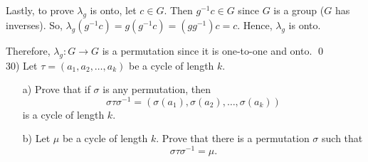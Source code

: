 \documentclass{article}
\begin{document}
Lastly, to prove $\lambda_g$ is onto, let $c \in G$. Then $g^{-1}c \in G$ since $G$ is a group ($G$ has inverses).  So, $\lambda_g(g^{-1}c) = g(g^{-1}c) = (gg^{-1})c = c.$ Hence, $\lambda_g$ is onto.

Therefore, $\lambda _g : G \to G$ is a permutation since it is one-to-one and onto. \qed \\

30) Let $\tau = (a_1, a_2, \ldots, a_k)$ be a cycle of length $k$.  \\
\begin{enumerate}
	\item[a)] Prove that if $\sigma$ is any permutation, then 
	\begin{equation}
		\sigma \tau \sigma^{-1} = (\sigma(a_1), \sigma(a_2), \ldots, \sigma(a_k))
	\end{equation}
is a cycle of length $k.$
	\item[b)] Let $\mu$ be a cycle of length $k.$ Prove that there is a permutation $\sigma$ such that 
$$ \sigma \tau \sigma^{-1} = \mu. $$
\end{enumerate}
\end{document}
